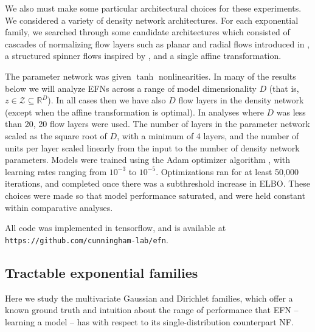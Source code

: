 \documentclass{article}
\begin{document}
We also must make some particular architectural choices for these experiments.  
We considered a variety of density network architectures.  For each exponential family, we searched through some candidate architectures which consisted of cascades of normalizing flow layers such as planar and radial flows introduced in \citep{rezende2015variational}, a structured spinner flows inspired by \citep{ bojarski2016structured}, and a single affine transformation.

The parameter network was given $\tanh$ nonlinearities. 
In many of the results below we will analyze EFNs across a range of model dimensionality $D$ (that is, $z \in \mathcal{Z} \subseteq \mathbb{R}^D$).    In all cases then we have also $D$ flow layers in the density network (except when the affine transformation is optimal).  In analyses where $D$ was less than 20, 20 flow layers were used.  The number of layers in the parameter network scaled as the square root of $D$, with a minimum of 4 layers, and the number of units per layer scaled linearly from the input to the number of density network parameters. Models were trained using the Adam optimizer algorithm \citep{kingma2014adam}, with learning rates ranging from $10^{-3}$ to $10^{-5}$.  Optimizations ran for at least 50,000 iterations, and completed once there was a subthreshold increase in ELBO. These choices were made so that model performance saturated, and were held constant within comparative analyses.

All code was implemented in tensorflow, and is available at {\tt https://github.com/cunningham-lab/efn}.

\subsection{Tractable exponential families}

Here we study the multivariate Gaussian and Dirichlet families, which offer a known ground truth and intuition about the range of performance that EFN -- learning a model – has with respect to its single-distribution counterpart NF. 
\end{document}
